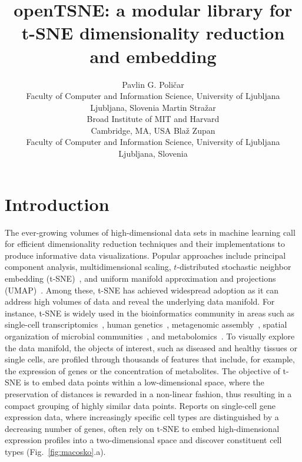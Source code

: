 \documentclass[article]{jss}
\author{
  Pavlin G. Poli\v{c}ar\\
  Faculty of Computer and Information Science, University of Ljubljana\\
  Ljubljana, Slovenia
  \AND
  Martin Stra\v{z}ar\\
  Broad Institute of MIT and Harvard\\
  Cambridge, MA, USA
  \AND
  Bla\v{z} Zupan\\
  Faculty of Computer and Information Science, University of Ljubljana\\
  Ljubljana, Slovenia
}
\title{openTSNE: a modular \proglang{Python} library for t-SNE dimensionality reduction and embedding}
\begin{document}


\section[Introduction]{Introduction} \label{sec:intro}

The ever-growing volumes of high-dimensional data sets in machine learning call for efficient dimensionality reduction techniques and their implementations to produce informative data visualizations. Popular approaches include principal component analysis, multidimensional scaling, $t$-distributed stochastic neighbor embedding (t-SNE)~\citep{maaten2008visualizing}, and uniform manifold approximation and projections (UMAP)~\citep{2018arXivUMAP}. Among these, t-SNE has achieved widespread adoption as it can address high volumes of data and reveal the underlying data manifold. For instance, t-SNE is widely used in the bioinformatics community in areas such as single-cell transcriptomics~\citep{macosko2015highly,cao2019single,tasic2018shared}, human genetics~\citep{hirata2019genetic}, metagenomic assembly~\citep{beaulaurier2018metagenomic}, spatial organization of microbial communities~\citep{sheth2019spatial}, and metabolomics~\citep{tkachev2019differences}. To visually explore the data manifold, the objects of interest, such as diseased and healthy tissues or single cells, are profiled through thousands of features that include, for example, the expression of genes or the concentration of metabolites. The objective of t-SNE is to embed data points within a low-dimensional space, where the preservation of distances is rewarded in a non-linear fashion, thus resulting in a compact grouping of highly similar data points. Reports on single-cell gene expression data, where increasingly specific cell types are distinguished by a decreasing number of genes, 
often rely on t-SNE to embed high-dimensional expression profiles into a two-dimensional space and discover constituent cell types (Fig.~\ref{fig:macosko}.a). 
\end{document}
